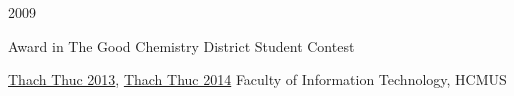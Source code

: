 


\begin{twocolentry}{2009}
	\begin{highlights}
		\item Award in The Good Chemistry District Student Contest
	\end{highlights}
	
\end{twocolentry}

\begin{onecolentry}
	\begin{highlights}
		\item \href{https://hmthanh.github.io/img/ThachThuc2013.jpg}{Thach Thuc 2013},  \href{https://hmthanh.github.io/img/ThachThuc2014.jpg}{Thach Thuc 2014} Faculty of Information Technology, HCMUS
	\end{highlights}
\end{onecolentry}